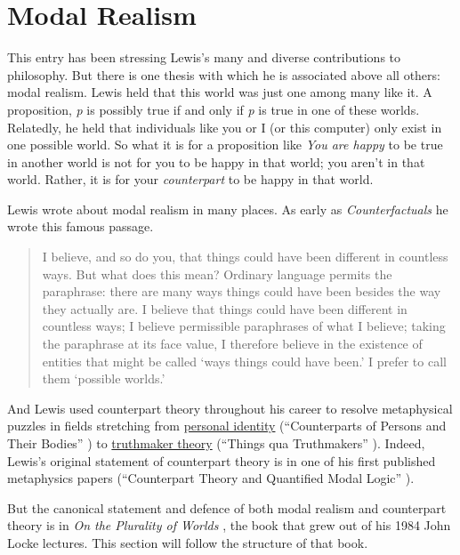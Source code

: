 \section{Modal Realism} 
This entry has been stressing Lewis's many and diverse contributions to philosophy. But there is one thesis with which he is associated above all others: modal realism. Lewis held that this world was just one among many like it. A proposition, \textit{p} is possibly true if and only if \textit{p} is true in one of these worlds. Relatedly, he held that individuals like you or I (or this computer) only exist in one possible world. So what it is for a proposition like \textit{You are happy} to be true in another world is not for you to be happy in that world; you aren't in that world. Rather, it is for your \textit{counterpart} to be happy in that world.

Lewis wrote about modal realism in many places. As early as \textit{Counterfactuals} he wrote this famous passage.

\begin{quote} I believe, and so do you, that things could have been different in countless ways. But what does this mean? Ordinary language permits the paraphrase: there are many ways things could have been besides the way they actually are. I believe that things could have been different in countless ways; I believe permissible paraphrases of what I believe; taking the paraphrase at its face value, I therefore believe in the existence of entities that might be called `ways things could have been.' I prefer to call them `possible worlds.' \citeyearpar[84]{Lewis1973a}
\end{quote}

\noindent And Lewis used counterpart theory throughout his career to resolve metaphysical puzzles in fields stretching from \href{http://plato.stanford.edu/identity-personal/}{personal identity} (``Counterparts of Persons and Their Bodies'' \citeyearpar{Lewis1971c}) to \href{http://plato.stanford.edu/truth/index.html#Tru}{truthmaker theory} (``Things qua Truthmakers'' \citeyearpar{Lewis2003b}). Indeed, Lewis's original statement of counterpart theory is in one of his first published metaphysics papers (``Counterpart Theory and Quantified Modal Logic'' \citeyearpar{Lewis1968}).

But the canonical statement and defence of both modal realism and counterpart theory is in \textit{On the Plurality of Worlds} \citeyearpar{Lewis1986a}, the book that grew out of his 1984 John Locke lectures. This section will follow the structure of that book.


